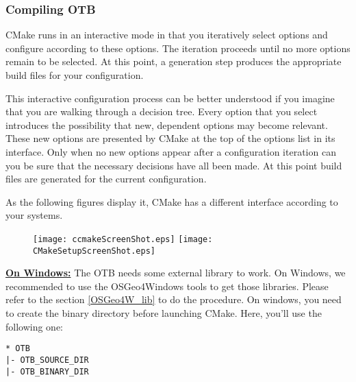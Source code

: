 \subsubsection{Compiling OTB}
CMake runs in an interactive mode in that you iteratively select
options and configure according to these options. The iteration
proceeds until no more options remain to be selected. At this point, a
generation step produces the appropriate build files for your
configuration.

This interactive configuration process can be better understood if you
imagine that you are walking through a decision tree.  Every option that you
select introduces the possibility that new, dependent options may become
relevant. These new options are presented by CMake at the top of the options
list in its interface.  Only when no new options appear after a configuration
iteration can you be sure that the necessary decisions have all been made. At
this point build files are generated for the current configuration.

As the following figures display it, CMake has a different interface according to your systems.
\label{sec:ConfiguringOTBwithVTK}

\begin{figure}[ht]
\centering
\texttt{[image: ccmakeScreenShot.eps]}
\texttt{[image: CMakeSetupScreenShot.eps]}
\label{fig:CMakeGUI}
\end{figure}


\textbf{\underline{On Windows:}}
The OTB needs some external library to work. On Windows, we recommended to use the OSGeo4Windows tools to get those libraries. Please refer to the section \ref{OSGeo4W_lib} to do the procedure.
On windows, you need to create the binary directory before launching CMake.
Here, you'll use the following one:
\begin{verbatim}
* OTB
|- OTB_SOURCE_DIR 
|- OTB_BINARY_DIR
\end{verbatim}

